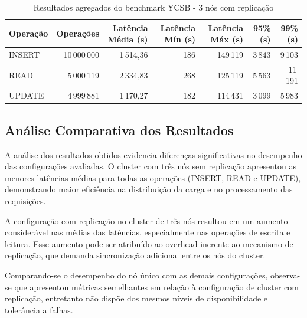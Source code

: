     \begin{table}[H]
    \centering
	\small
    \caption{Resultados agregados do benchmark YCSB - 3 nós com replicação} 
    \begin{tabular}{lrrrrrr}
    \hline
	Operação & Operações & Latência Média (\textmu s) & Latência Mín (\textmu s) & Latência Máx (\textmu s) & 95\% (\textmu s) & 99\% (\textmu s) \\
	\hline
	INSERT   & 10\,000\,000 & 1\,514,36 & 186 & 149\,119 & 3\,843 & 9\,103 \\
	READ     & 5\,000\,119  & 2\,334,83 & 268 & 125\,119 & 5\,563 & 11\,191 \\
	UPDATE   & 4\,999\,881  & 1\,170,27 & 182 & 114\,431 & 3\,099 & 5\,983 \\
	\hline
    \end{tabular}
    \end{table}

\subsection{Análise Comparativa dos Resultados}

A análise dos resultados obtidos evidencia diferenças significativas no desempenho das configurações avaliadas.
O cluster com três nós sem replicação apresentou as menores latências médias para todas as operações (INSERT, READ e UPDATE),
demonstrando maior eficiência na distribuição da carga e no processamento das requisições.

A configuração com replicação no cluster de três nós resultou em um aumento considerável nas médias das latências,
especialmente nas operações de escrita e leitura. 
Esse aumento pode ser atribuído ao overhead inerente ao mecanismo de replicação, que demanda sincronização adicional entre os nós do cluster.

Comparando-se o desempenho do nó único com as demais configurações,
observa-se que  apresentou métricas semelhantes em relação à configuração de cluster com replicação, entretanto não dispõe dos mesmos níveis de disponibilidade e tolerância a falhas.

